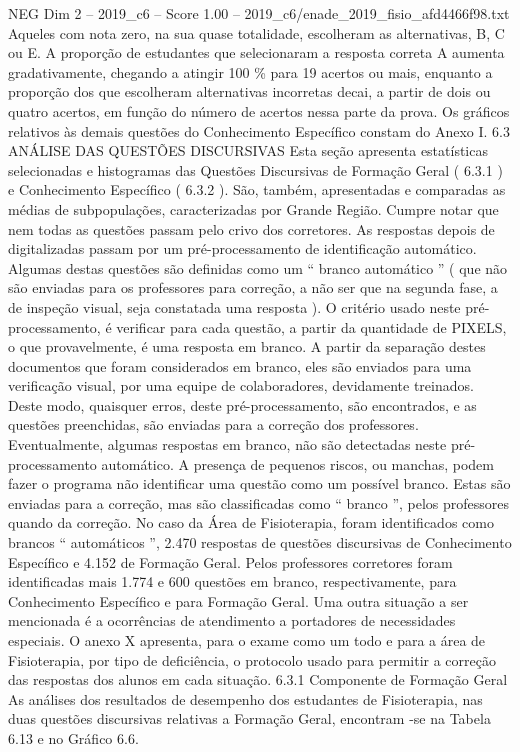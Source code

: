 \begin{textsample}{NEG Dim 2 – 2019\_c6 – Score 1.00 – 2019\_c6/enade\_2019\_fisio\_afd4466f98.txt}
Aqueles com nota zero, na sua quase totalidade, escolheram as alternativas, B, C ou E.
A proporção de estudantes que selecionaram a resposta correta A aumenta gradativamente, chegando a atingir 100 \% para 19 acertos ou mais, enquanto a proporção dos que escolheram alternativas incorretas decai, a partir de dois ou quatro acertos, em função do número de acertos nessa parte da prova.
Os gráficos relativos às demais questões do Conhecimento Específico constam do Anexo I. 6.3 ANÁLISE DAS QUESTÕES DISCURSIVAS Esta seção apresenta estatísticas selecionadas e histogramas das Questões Discursivas de Formação Geral ( 6.3.1 ) e Conhecimento Específico ( 6.3.2 ).
São, também, apresentadas e comparadas as médias de subpopulações, caracterizadas por Grande Região.
Cumpre notar que nem todas as questões passam pelo crivo dos corretores.
As respostas depois de digitalizadas passam por um pré-processamento de identificação automático.
Algumas destas questões são definidas como um “ branco automático ” ( que não são enviadas para os professores para correção, a não ser que na segunda fase, a de inspeção visual, seja constatada uma resposta ).
O critério usado neste pré-processamento, é verificar para cada questão, a partir da quantidade de PIXELS, o que provavelmente, é uma resposta em branco.
A partir da separação destes documentos que foram considerados em branco, eles são enviados para uma verificação visual, por uma equipe de colaboradores, devidamente treinados.
Deste modo, quaisquer erros, deste pré-processamento, são encontrados, e as questões preenchidas, são enviadas para a correção dos professores.
Eventualmente, algumas respostas em branco, não são detectadas neste pré-processamento automático.
A presença de pequenos riscos, ou manchas, podem fazer o programa não identificar uma questão como um possível branco.
Estas são enviadas para a correção, mas são classificadas como “ branco ”, pelos professores quando da correção.
No caso da Área de Fisioterapia, foram identificados como brancos “ automáticos ”, 2.470 respostas de questões discursivas de Conhecimento Específico e 4.152 de Formação Geral.
Pelos professores corretores foram identificadas mais 1.774 e 600 questões em branco, respectivamente, para Conhecimento Específico e para Formação Geral.
Uma outra situação a ser mencionada é a ocorrências de atendimento a portadores de necessidades especiais.
O anexo X apresenta, para o exame como um todo e para a área de Fisioterapia, por tipo de deficiência, o protocolo usado para permitir a correção das respostas dos alunos em cada situação. 6.3.1 Componente de Formação Geral As análises dos resultados de desempenho dos estudantes de Fisioterapia, nas duas questões discursivas relativas a Formação Geral, encontram -se na Tabela 6.13 e no Gráfico 6.6.

\end{textsample}
